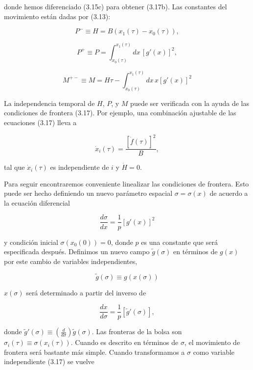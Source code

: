 donde hemos diferenciado (3.15c) para obtener (3.17b). Las constantes del movimiento están dadas por (3.13):

\begin{equation}
{P}^{-} \equiv H = B ({x}_{1} (\tau) - {x}_{0} (\tau)),
\end{equation}

\begin{equation}
{P}^{+} \equiv P = \int_{{x}_{0}(\tau)}^{{x}_{1}(\tau)} dx \, [g'(x)]^{2},
\end{equation}

\begin{equation}
{M}^{+-} \equiv M = H \tau - \int_{{x}_{0}(\tau)}^{{x}_{1}(\tau)} dx \, x [{g}' (x)]^{2}
\end{equation}

La independencia temporal de $H$, $P$, y $M$ puede ser verificada con la ayuda de las condiciones de frontera (3.17). Por ejemplo, una combinación ajustable de las ecuaciones (3.17) lleva a

\[
\dot{x}_{i}(\tau) = \frac{[\dot{f}(\tau)]^{2}}{B},
\]

tal que $\dot{x}_{i}(\tau)$ es independiente de $i$ y $\dot{H} = 0$.

Para seguir encontraremos conveniente linealizar las condiciones de frontera. Esto puede ser hecho definiendo un nuevo parámetro espacial ${\sigma} = {\sigma}(x)$ de acuerdo a la ecuación diferencial

\begin{equation}
\frac{d \sigma}{d x} = \frac{1}{p} [g'(x)]^{2}
\end{equation}

y condición inicial $\sigma ( {x}_{0}(0)) = 0$, donde $p$ es una constante que será especificada después.
Definimos un nuevo campo $\tilde{g} (\sigma)$ en términos de $g(x)$ por este cambio de variables independientes,

\begin{equation}
\tilde{g} (\sigma) \equiv {g} (x(\sigma))
\end{equation}

$x(\sigma)$ será determinado a partir del inverso de

\begin{equation}
\frac{dx}{d\sigma} = \frac{1}{p} [\tilde{g}'(\sigma)],
\end{equation}

donde $\tilde{g}' (\sigma) \equiv (\frac{d}{d\sigma}) \tilde{g} (\sigma)$. Las fronteras de la bolsa son ${\sigma}_{i} (\tau) \equiv \sigma ({x}_{i} (\tau))$. Cuando es descrito en términos de $\sigma$, el movimiento de frontera será bastante más simple. Cuando transformamos a $\sigma$ como variable independiente (3.17) se vuelve

